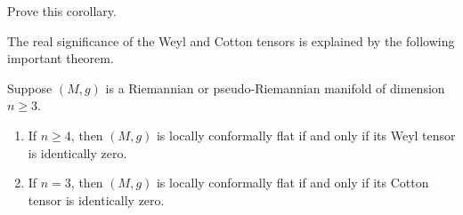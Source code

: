 \begin{exercise}
\label{exer:prove-cotton-tensor-vanishes}
Prove this corollary.
\end{exercise}

The real significance of the Weyl and Cotton tensors is explained by the following important theorem.

\begin{theorem}
\label{thm:weyl-schouten}
Suppose $(M,g)$ is a Riemannian or pseudo-Riemannian manifold of dimension $n \geq 3$.
\begin{enumerate}
\item[(a)] If $n \geq 4$, then $(M,g)$ is locally conformally flat if and only if its Weyl tensor is identically zero.
\item[(b)] If $n = 3$, then $(M,g)$ is locally conformally flat if and only if its Cotton tensor is identically zero.
\end{enumerate}
\end{theorem}

